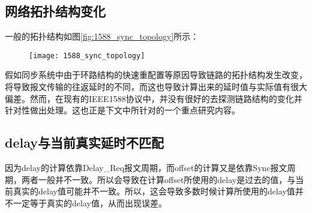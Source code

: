 \subsection{网络拓扑结构变化}
一般的拓扑结构如图\ref{fig:1588_sync_topology}所示\supercite{2}：

\begin{figure}[!hbp]
  \centering
  \begin{minipage}[b]{0.6\textwidth}
    \captionstyle{\centering}
    \centering
    \texttt{[image: 1588\_sync\_topology]}
  \end{minipage}     
\end{figure}

假如同步系统中由于环路结构的快速重配置等原因导致链路的拓扑结构发生改变，将导致报文传输的往返延时的不同，而这也导致计算出来的延时值与实际值有很大偏差。然而，在现有的IEEE1588协议中，并没有很好的去探测链路结构的变化并针对性做出处理。这也正是下文中所针对的一个重点研究内容。

\subsection{delay与当前真实延时不匹配}
因为delay的计算依靠Delay\_Req报文周期，而offset的计算又是依靠Sync报文周期，两者一般并不一致。所以会导致在计算offset所使用的delay是过去的值，与当前真实的delay值可能并不一致。所以，这会导致多数时候计算所使用的delay值并不一定等于真实的delay值，从而出现误差。


